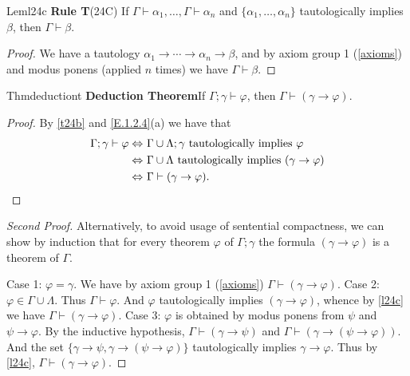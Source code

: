 \begin{reference}{Lem}{l24c}
  \textbf{Rule T}\quad (24C) If $\Gamma\vdash \alpha_1,\dots,\Gamma\vdash \alpha_n$ and $\{\alpha_1,\dots,\alpha_n\}$ tautologically implies $\beta$, then $\Gamma\vdash \beta$.
\end{reference}

\begin{proof}
  We have a tautology $\alpha_1\rightarrow\cdots\rightarrow \alpha_n\rightarrow \beta$, and by axiom group 1 (\ref{axioms}) and modus ponens (applied $n$ times) we have $\Gamma\vdash \beta$.
\end{proof}

\begin{reference}{Thm}{deductiont}
  \textbf{Deduction Theorem}\quad If $\Gamma;\gamma\vdash \varphi$, then $\Gamma\vdash(\gamma\rightarrow \varphi).$
\end{reference}

\begin{proof}
  By \ref{t24b} and \ref{E.1.2.4}(a) we have that
  \begin{align*}
    \Gamma;\gamma\vdash \varphi\Leftrightarrow\  & \Gamma\cup \Lambda;\gamma\text{ tautologically implies }\varphi \\\Leftrightarrow\ &\Gamma\cup \Lambda\text{ tautologically implies }(\gamma\rightarrow \varphi)\\\Leftrightarrow\ &\Gamma\vdash(\gamma\rightarrow \varphi).\qedhere
  \end{align*}
\end{proof}

\begin{proof}[Second Proof]
  Alternatively, to avoid usage of sentential compactness, we can show by induction that for every theorem $\varphi$ of $\Gamma;\gamma$ the formula $(\gamma\rightarrow \varphi)$ is a theorem of $\Gamma$.

  Case 1: $\varphi=\gamma$. We have by axiom group 1 (\ref{axioms}) $\Gamma\vdash(\gamma\rightarrow \varphi)$.\newline
  Case 2: $\varphi\in \Gamma\cup \Lambda$. Thus $\Gamma\vdash \varphi$. And $\varphi$ tautologically implies $(\gamma\rightarrow \varphi)$, whence by \ref{l24c} we have $\Gamma\vdash(\gamma\rightarrow \varphi)$.\newline
  Case 3: $\varphi$ is obtained by modus ponens from $\psi$ and $\psi\rightarrow \varphi$. By the inductive hypothesis, $\Gamma\vdash(\gamma\rightarrow \psi)$ and $\Gamma\vdash(\gamma\rightarrow(\psi\rightarrow \varphi))$. And the set $\{\gamma\rightarrow \psi, \gamma\rightarrow(\psi\rightarrow \varphi)\}$ tautologically implies $\gamma\rightarrow \varphi$. Thus by \ref{l24c}, $\Gamma\vdash(\gamma\rightarrow \varphi)$.
\end{proof}

